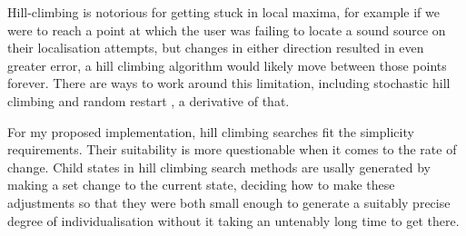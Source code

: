 Hill-climbing is notorious for getting stuck in local maxima, for example if we were to reach a point at which the user was failing to locate a sound source on their localisation attempts, but changes in either direction resulted in even greater error, a hill climbing algorithm would likely move between those points forever. There are ways to work around this limitation, including stochastic hill climbing \citep{forrest1993} and random restart \citep{norvig1995}, a derivative of that. 

For my proposed implementation, hill climbing searches fit the simplicity requirements. Their suitability is more questionable when it comes to the rate of change. Child states in hill climbing search methods are usally generated by making a set change to the current state, deciding how to make these adjustments so that they were both small enough to generate a suitably precise degree of individualisation without it taking an untenably long time to get there. 

